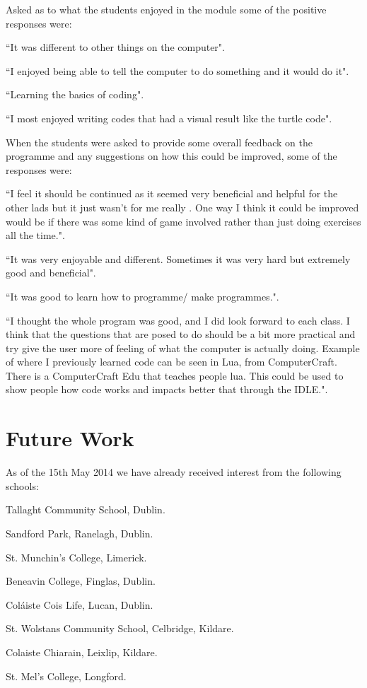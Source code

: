 \documentclass[a4paper]{article}
\begin{document}
Asked as to what the students enjoyed in the module some of the positive responses were:

\begin{compactitem}
  \item ``It was different to other things on the computer". 
  \item ``I enjoyed being able to tell the computer to do something and it would do it".
  \item ``Learning the basics of coding".
  \item ``I most enjoyed writing codes that had a visual result like the turtle code".
\end{compactitem}  

When the students were asked to provide some overall feedback on the programme and any suggestions on how this could be improved, some of the responses were:

\begin{compactitem}
  \item ``I feel it should be continued as it seemed very beneficial and helpful for the other lads but it just wasn't for me really . One way I think it could be improved would be if there was some kind of game involved rather than just doing exercises all the time.". 
  \item ``It was very enjoyable and different. Sometimes it was very hard but extremely good and beneficial".
  \item ``It was good to learn how to programme/ make programmes.".
  \item ``I thought the whole program was good, and I did look forward to each class. I think that the questions that are posed to do should be a bit more practical and try give the user more of feeling of what the computer is actually doing. Example of where I previously learned code can be seen in Lua, from ComputerCraft. There is a ComputerCraft Edu that teaches people lua. This could be used to show people how code works and impacts better that through the IDLE.".
\end{compactitem}  


\section{Future Work} \label{Sect:FutWork}
As of the 15th May 2014 we have already received interest from the following schools:
\begin{compactitem}
  \item Tallaght Community School, Dublin. 
  \item Sandford Park, Ranelagh, Dublin.
  \item St. Munchin's College, Limerick.
  \item Beneavin College, Finglas, Dublin.
  \item Coláiste Cois Life, Lucan, Dublin.
  \item St. Wolstans Community School, Celbridge, Kildare. 
  \item Colaiste Chiarain, Leixlip, Kildare. 
  \item St. Mel's College, Longford.
\end{compactitem}  
\end{document}
